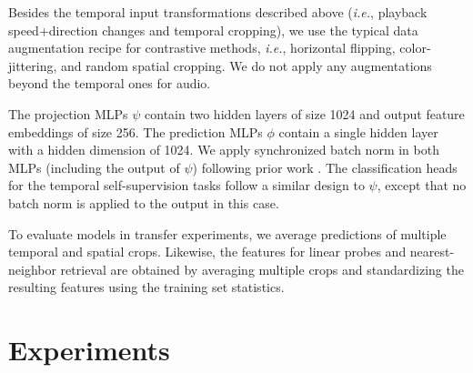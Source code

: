 \documentclass[letterpaper]{article} %
\newcommand{\ie}{\emph{i.e.}}
\begin{document}
Besides the temporal input transformations described above (\ie, playback speed+direction changes and temporal cropping), we use the typical data augmentation recipe for contrastive methods, \ie, horizontal flipping, color-jittering, and random spatial cropping.
We do not apply any augmentations beyond the temporal ones for audio. 

The projection MLPs $\psi$ contain two hidden layers of size 1024 and output feature embeddings of size 256.
The prediction MLPs $\phi$ contain a single hidden layer with a hidden dimension of 1024. 
We apply synchronized batch norm in both MLPs (including the output of $\psi$) following prior work \cite{chen2020simple}.
The classification heads for the temporal self-supervision tasks follow a similar design to $\psi$, except that no batch norm is applied to the output in this case. 

To evaluate models in transfer experiments, we average predictions of multiple temporal and spatial crops. 
Likewise, the features for linear probes and nearest-neighbor retrieval are obtained by averaging multiple crops and standardizing the resulting features using the training set statistics. 




\section{Experiments}
\end{document}
